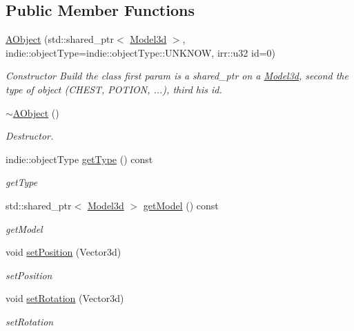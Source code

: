 \subsection*{Public Member Functions}
\begin{DoxyCompactItemize}
\item 
\mbox{\label{classAObject_a12a7789fca6342e9ff5c52c7cfd465d1}} 
\hyperlink{classAObject_a12a7789fca6342e9ff5c52c7cfd465d1}{A\+Object} (std\+::shared\+\_\+ptr$<$ \hyperlink{classModel3d}{Model3d} $>$, indie\+::object\+Type=indie\+::object\+Type\+::\+U\+N\+K\+N\+OW, irr\+::u32 id=0)
\begin{DoxyCompactList}\small\item\em Constructor Build the class first param is a shared\+\_\+ptr on a \hyperlink{classModel3d}{Model3d}, second the type of object (C\+H\+E\+ST, P\+O\+T\+I\+ON, ...), third his id. \end{DoxyCompactList}\item 
\hyperlink{classAObject_ac17f3a1944792c280a3cbd83d839bc4e}{$\sim$\+A\+Object} ()
\begin{DoxyCompactList}\small\item\em Destructor. \end{DoxyCompactList}\item 
indie\+::object\+Type \hyperlink{classAObject_afcbaa047c0d02ca29b76875157a1eb1e}{get\+Type} () const
\begin{DoxyCompactList}\small\item\em get\+Type \end{DoxyCompactList}\item 
std\+::shared\+\_\+ptr$<$ \hyperlink{classModel3d}{Model3d} $>$ \hyperlink{classAObject_a3ffaa331c1842c5bf782c9a0343474bc}{get\+Model} () const
\begin{DoxyCompactList}\small\item\em get\+Model \end{DoxyCompactList}\item 
void \hyperlink{classAObject_ab4a2dc3dad1a54ff80d59c42a51479fb}{set\+Position} (Vector3d)
\begin{DoxyCompactList}\small\item\em set\+Position \end{DoxyCompactList}\item 
void \hyperlink{classAObject_a38ba628dcec6be910ce9d3c9f0de0de7}{set\+Rotation} (Vector3d)
\begin{DoxyCompactList}\small\item\em set\+Rotation \end{DoxyCompactList}\item 

\end{DoxyCompactItemize}
